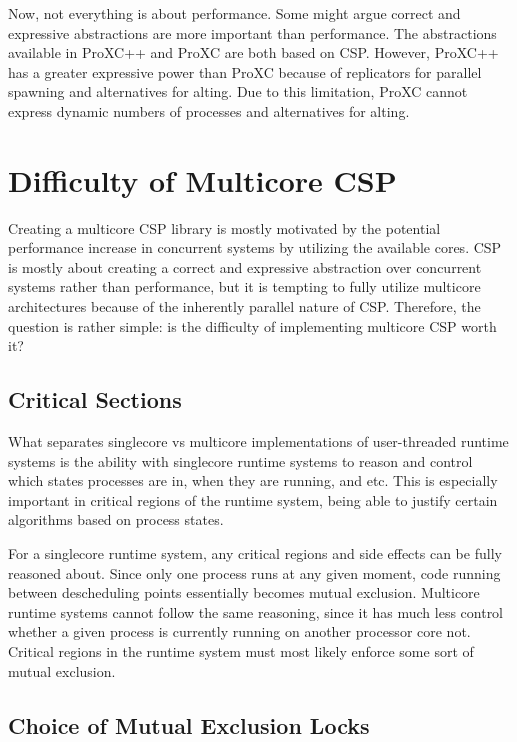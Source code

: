 Now, not everything is about performance. Some might argue correct and expressive abstractions are more important than performance. The abstractions available in ProXC++ and ProXC are both based on CSP. However, ProXC++ has a greater expressive power than ProXC because of replicators for parallel spawning and alternatives for alting. Due to this limitation, ProXC cannot express dynamic numbers of processes and alternatives for alting. 



\chapter{Difficulty of Multicore CSP}

Creating a multicore CSP library is mostly motivated by the potential performance increase in concurrent systems by utilizing the available cores. CSP is mostly about creating a correct and expressive abstraction over concurrent systems rather than performance, but it is tempting to fully utilize multicore architectures because of the inherently parallel nature of CSP. Therefore, the question is rather simple: is the difficulty of implementing multicore CSP worth it?

\section{Critical Sections}

What separates singlecore vs multicore implementations of user\hyp{}threaded runtime systems is the ability with singlecore runtime systems to reason and control which states processes are in, when they are running, and etc. This is especially important in critical regions of the runtime system, being able to justify certain algorithms based on process states.

For a singlecore runtime system, any critical regions and side effects can be fully reasoned about. Since only one process runs at any given moment, code running between descheduling points essentially becomes mutual exclusion. Multicore runtime systems cannot follow the same reasoning, since it has much less control whether a given process is currently running on another processor core not. Critical regions in the runtime system must most likely enforce some sort of mutual exclusion. 

\section{Choice of Mutual Exclusion Locks}

